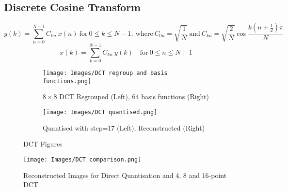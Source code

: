 \subsection{Discrete Cosine Transform}
\vspace{-2mm}
\begin{equation}
    y(k) = \sum_{n=0}^{N-1} C_{kn}{\ }x(n) {\ } \text{for} {\ } 0 \leq k \leq N-1, {\ } \text{where} {\ } C_{0n} = \sqrt{\frac{1}{N}} {\ } \text{and} {\ } C_{kn} = \sqrt{\frac{2}{N}} \cos \frac{k(n+\frac{1}{2})\pi}{N}
    \label{eqn:dct}
\end{equation}
\vspace{-2mm}
\begin{equation}
    x(k) = \sum_{k=0}^{N-1} C_{kn} {\ } y(k) \quad \text{for} {\ } 0 \leq n \leq N-1
    \label{eqn:idct}
\end{equation}
\vspace{-2mm}

\begin{figure}[h]
\centering
\begin{subfigure}{.5\textwidth}
  \centering
  \texttt{[image: Images/DCT regroup and basis functions.png]}
  \caption{$8 \times 8$ DCT Regrouped (Left), 64 basis functions (Right)}
  \label{fig:DCT regrouped and basis function}
\end{subfigure}%
\begin{subfigure}{.5\textwidth}
  \centering
  \texttt{[image: Images/DCT quantised.png]}
  \caption{Quantised with step=17 (Left), Reconstructed (Right)}
  \label{fig:DCT quantised}
\end{subfigure}
\caption{DCT Figures}
\label{fig:DCT introduction}
\end{figure}

\begin{figure}[h]
    \centering
    \texttt{[image: Images/DCT comparison.png]}
    \caption{Reconstructed Images for Direct Quantisation and 4, 8 and 16-point DCT}
    \label{fig:DCT 4 8 16}
\end{figure}

